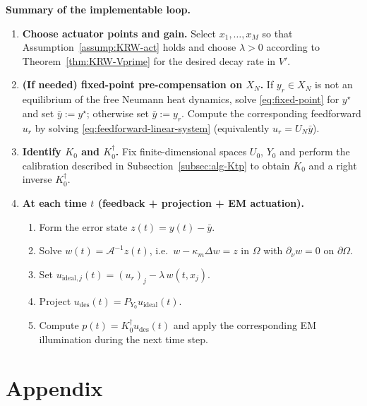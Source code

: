 \documentclass[11pt,a4paper]{article}
\numberwithin{equation}{section}
\theoremstyle{definition}
\newcommand{\1}{\mathbbm{1}}
\begin{document}
\noindent\textbf{Summary of the implementable loop.}
\begin{enumerate}
\item \textbf{Choose actuator points and gain.}
Select $x_1,\dots,x_M$ so that Assumption~\ref{assump:KRW-act} holds and choose $\lambda>0$
according to Theorem~\ref{thm:KRW-Vprime} for the desired decay rate in $V'$.

\item \textbf{(If needed) fixed-point pre-compensation on $X_N$.}
If $y_r\in X_N$ is not an equilibrium of the free Neumann heat dynamics, solve \eqref{eq:fixed-point} for
$y^\star$ and set $\bar y:=y^\star$; otherwise set $\bar y:=y_r$.
Compute the corresponding feedforward $u_r$ by solving \eqref{eq:feedforward-linear-system}
(equivalently $u_r=U_N\bar y$).

\item \textbf{Identify $K_0$ and $K_0^\dagger$.}
Fix finite-dimensional spaces $U_0$, $Y_0$ and perform the calibration described in
Subsection~\ref{subsec:alg-Ktp} to obtain $K_0$ and a right inverse $K_0^\dagger$.

\item \textbf{At each time $t$ (feedback + projection + EM actuation).}
\begin{enumerate}
\item Form the error state $z(t)=y(t)-\bar y$.
\item Solve $w(t)=\mathcal A^{-1}z(t)$, i.e.\ $w-\kappa_m\Delta w=z$ in $\Omega$ with $\partial_\nu w=0$ on $\partial\Omega$.
\item Set $u_{\mathrm{ideal},j}(t)=(u_r)_j-\lambda\,w(t,x_j)$.
\item Project $u_{\mathrm{des}}(t)=P_{Y_0}u_{\mathrm{ideal}}(t)$.
\item Compute $p(t)=K_0^\dagger u_{\mathrm{des}}(t)$ and apply the corresponding EM illumination during the next time step.
\end{enumerate}
\end{enumerate}


\section{Appendix}\label{appendix}
\end{document}
